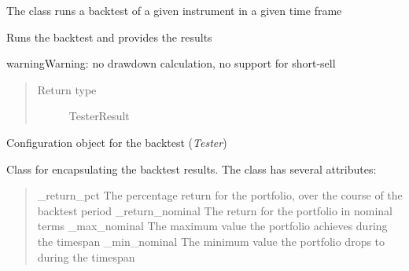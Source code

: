 \documentclass[letterpaper,10pt,english]{sphinxmanual}
\begin{document}
\label{index:module-model.tests}\label{index:module-core.backtest}

\begin{fulllineitems}
\label{index:core.backtest.Tester}
The  class runs a backtest of a given instrument in a given time frame

\begin{fulllineitems}
\label{index:core.backtest.Tester.run}
Runs the backtest and provides the results

\begin{notice}{warning}{Warning:}
no drawdown calculation, no support for short-sell
\end{notice}
\begin{quote}\begin{description}
\item[{Return type}] \leavevmode
TesterResult

\end{description}\end{quote}

\end{fulllineitems}


\end{fulllineitems}


\begin{fulllineitems}
\label{index:core.backtest.TesterConfiguration}
Configuration object for the backtest (\emph{Tester})

\end{fulllineitems}


\begin{fulllineitems}
\label{index:core.backtest.TesterResult}
Class for encapsulating the backtest results. The class has several attributes:
\begin{quote}

\_return\_pct     The percentage return for the portfolio, over the course of the backtest period
\_return\_nominal The return for the portfolio in nominal terms
\_max\_nominal    The maximum value the portfolio achieves during the timespan
\_min\_nominal    The minimum value the portfolio drops to during the timespan
\end{quote}

\end{fulllineitems}
\end{document}
